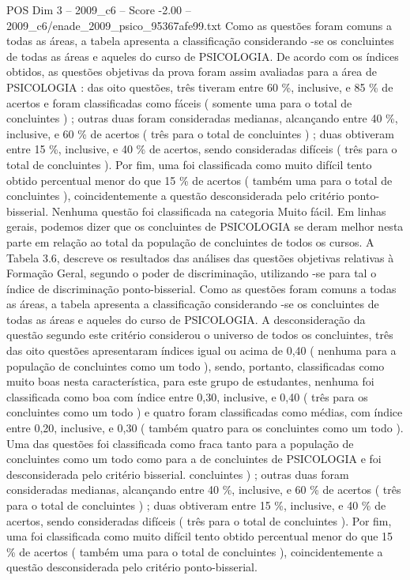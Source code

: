 \begin{textsample}{POS Dim 3 – 2009\_c6 – Score -2.00 – 2009\_c6/enade\_2009\_psico\_95367afe99.txt}
Como as questões foram comuns a todas as áreas, a tabela apresenta a classificação considerando -se os concluintes de todas as áreas e aqueles do curso de PSICOLOGIA.
De acordo com os índices obtidos, as questões objetivas da prova foram assim avaliadas para a área de PSICOLOGIA : das oito questões, três tiveram entre 60 \%, inclusive, e 85 \% de acertos e foram classificadas como fáceis ( somente uma para o total de concluintes ) ; outras duas foram consideradas medianas, alcançando entre 40 \%, inclusive, e 60 \% de acertos ( três para o total de concluintes ) ; duas obtiveram entre 15 \%, inclusive, e 40 \% de acertos, sendo consideradas difíceis ( três para o total de concluintes ).
Por fim, uma foi classificada como muito difícil tento obtido percentual menor do que 15 \% de acertos ( também uma para o total de concluintes ), coincidentemente a questão desconsiderada pelo critério ponto-bisserial.
Nenhuma questão foi classificada na categoria Muito fácil.
Em linhas gerais, podemos dizer que os concluintes de PSICOLOGIA se deram melhor nesta parte em relação ao total da população de concluintes de todos os cursos.
A Tabela 3.6, descreve os resultados das análises das questões objetivas relativas à Formação Geral, segundo o poder de discriminação, utilizando -se para tal o índice de discriminação ponto-bisserial.
Como as questões foram comuns a todas as áreas, a tabela apresenta a classificação considerando -se os concluintes de todas as áreas e aqueles do curso de PSICOLOGIA.
A desconsideração da questão segundo este critério considerou o universo de todos os concluintes, três das oito questões apresentaram índices igual ou acima de 0,40 ( nenhuma para a população de concluintes como um todo ), sendo, portanto, classificadas como muito boas nesta característica, para este grupo de estudantes, nenhuma foi classificada como boa com índice entre 0,30, inclusive, e 0,40 ( três para os concluintes como um todo ) e quatro foram classificadas como médias, com índice entre 0,20, inclusive, e 0,30 ( também quatro para os concluintes como um todo ).
Uma das questões foi classificada como fraca tanto para a população de concluintes como um todo como para a de concluintes de PSICOLOGIA e foi desconsiderada pelo critério bisserial. concluintes ) ; outras duas foram consideradas medianas, alcançando entre 40 \%, inclusive, e 60 \% de acertos ( três para o total de concluintes ) ; duas obtiveram entre 15 \%, inclusive, e 40 \% de acertos, sendo consideradas difíceis ( três para o total de concluintes ).
Por fim, uma foi classificada como muito difícil tento obtido percentual menor do que 15 \% de acertos ( também uma para o total de concluintes ), coincidentemente a questão desconsiderada pelo critério ponto-bisserial.

\end{textsample}
